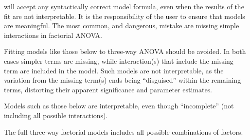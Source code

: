 \documentclass[krantz2]{krantz}\usepackage{knitr}%
\begin{document}
\begin{warningbox}
  \Rlang will accept any syntactically correct model formula, even when the results of the fit are not interpretable. It is the responsibility of the user to ensure that models are meaningful. The most common, and dangerous, mistake are missing simple interactions in factorial ANOVA.

  Fitting models like those below to three-way ANOVA should be avoided. In both cases simpler terms are missing, while interaction(s) that include the missing term are included in the model. Such models are not interpretable, as the variation from the missing term(s) ends being ``disguised'' within the remaining terms, distorting their apparent significance and parameter estimates.

\begin{knitrout}\footnotesize
{}\color{fgcolor}\begin{kframe}
\begin{alltt}
 \hlopt{~}  \hlopt{+}  \hlopt{+}  \hlopt{*}  \hlopt{+}  \hlopt{*}  \hlopt{+}  \hlopt{*} 
 \hlopt{~}  \hlopt{+}  \hlopt{+}  \hlopt{+}  \hlopt{*}  \hlopt{*} 
\end{alltt}
\end{kframe}
\end{knitrout}

  Models such as those below are interpretable, even though ``incomplete'' (not including all possible interactions).
\begin{knitrout}\footnotesize
{}\color{fgcolor}\begin{kframe}
\begin{alltt}
 \hlopt{~}  \hlopt{+}  \hlopt{+}  \hlopt{+}  \hlopt{*}  \hlopt{+}  \hlopt{*}  \hlopt{+}  \hlopt{*} 
 \hlopt{~}  \hlopt{+}  \hlopt{+}  \hlopt{+}  \hlopt{*} 
\end{alltt}
\end{kframe}
\end{knitrout}

  The full three-way factorial models includes all possible combinations of factors.
\begin{knitrout}\footnotesize
{}\color{fgcolor}\begin{kframe}
\begin{alltt}
 \hlopt{~}  \hlopt{+}  \hlopt{+}  \hlopt{+}  \hlopt{*}  \hlopt{+}  \hlopt{*}  \hlopt{+}  \hlopt{*}  \hlopt{+}  \hlopt{*}  \hlopt{*} 
\end{alltt}
\end{kframe}
\end{knitrout}

\end{warningbox}
\end{document}

